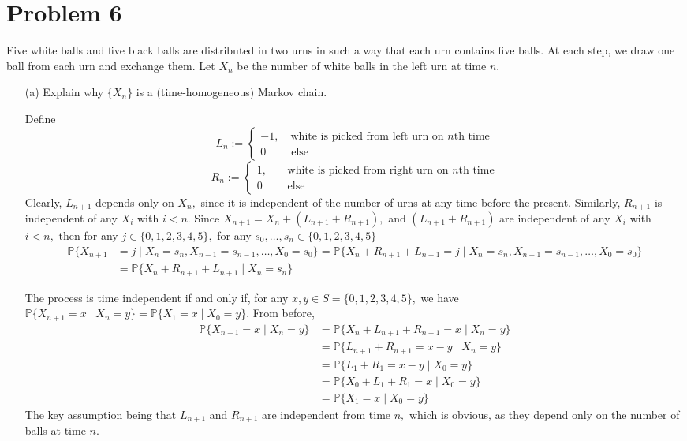 \documentclass[11pt]{article}
\newcommand{\bbP}{\mathbb{P}}
\begin{document}
\section*{Problem 6}
\begin{problem}
    Five white balls and five black balls are distributed in two urns in such a way that each urn contains five balls. At each step, we draw one ball from each urn and exchange them. Let \( X_n \) be the number of white balls in the left urn at time \( n \).

\begin{enumerate}
    \item[(a)] Explain why \( \{X_n\} \) is a (time-homogeneous) Markov chain.
    \begin{solution}
    Define 
    \[L_n := \begin{cases}
        -1, \quad \text{white is picked from left urn on $n$th time}\\
        0 \quad \quad \;\text{else}
    \end{cases}\]  \[R_n := \begin{cases}
        1, \quad \;\;\;\text{white is picked from right urn on $n$th time}\\
        0 \quad \quad \;\text{else}
    \end{cases}\]
    Clearly, $L_{n+1}$ depends only on $X_n,$ since it is independent of the number of urns at any time before the present. Similarly, $R_{n + 1}$ is independent of any $X_i$ with $i < n.$ Since  $X_{n + 1} = X_n + (L_{n+1} + R_{n+1}),$ and $(L_{n + 1} + R_{n+1})$ are independent of any $X_i$ with $i<n,$ then for any $j \in \{0,1,2,3,4,5\},$ for any $s_0, \dots, s_n \in \{0,1,2,3,4,5\}$
    \begin{align*}
    \bbP\{X_{n + 1} &= j\mid X_n = s_n, X_{n-1} = s_{n-1}, \dots, X_0 = s_0\} = \bbP\{X_n + R_{n + 1} + L_{n + 1} = j \mid X_n = s_n, X_{n-1} = s_{n-1}, \dots, X_0 = s_0\}\\ &= \bbP\{X_n + R_{n + 1} + L_{n + 1} \mid X_n = s_n\}    
    \end{align*}

    The process is time independent if and only if, for any $x,y \in S = \{0,1,2,3,4,5\},$ we have $\bbP\{X_{n + 1} = x\mid X_n = y\} = \bbP\{X_1 = x \mid X_0 = y\}.$ From before, 
    \begin{align*}
        \bbP\{X_{n + 1} = x \mid X_n = y\} &= \bbP\{X_n + L_{n + 1} + R_{n + 1} =x\mid X_n = y\}\\
        &= \bbP\{L_{n + 1} + R_{n + 1}=x-y \mid X_n = y\}\\
        &= \bbP\{L_1 + R_1 = x-y \mid X_0 = y\}\\
        &= \bbP\{X_0 + L_1 + R_1  = x\mid X_0 = y\}\\
        &= \bbP\{X_1 = x \mid X_0 = y \}
    \end{align*}
    The key assumption being that $L_{n+1}$ and $R_{n+1}$ are independent from time $n,$ which is obvious, as they depend only on the number of balls at time $n.$
    

\end{solution}
\end{enumerate}
\end{problem}
\end{document}
